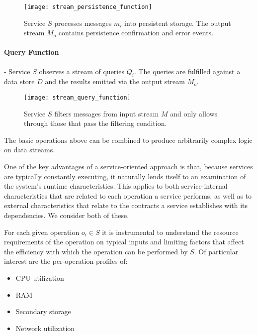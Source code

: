 \begin{figure}[H]
\texttt{[image: stream\_persistence\_function]}
\centering
\caption {Service $S$ processes messages $m_i$ into persistent storage. The output stream $M_o$ contains persistence confirmation and error events.}
\label{fig:stream_persistence_function}
\end{figure}

\paragraph{Query Function} - Service $S$ observes a stream of queries $Q_i$. The queries are fulfilled against a data store $D$ and the results emitted via the output stream $M_o$.

\begin{figure}[H]
\texttt{[image: stream\_query\_function]}
\centering
\caption {Service $S$ filters messages from input stream $M$ and only allows through those that pass the filtering condition.}
\label{fig:stream_query_function}
\end{figure}

The basic operations above can be combined to produce arbitrarily complex logic on data streams.

One of the key advantages of a service-oriented approach is that, because services are typically constantly executing, it naturally lends itself to an examination of the system's runtime characteristics. This applies to both service-internal characteristics that are related to each operation a service performs, as well as to external characteristics that relate to the contracts a service establishes with its dependencies. We consider both of these.

For each given operation $o_i \in S$ it is instrumental to understand the resource requirements of the operation on typical inputs and limiting factors that affect the efficiency with which the operation can be performed by $S$. Of particular interest are the per-operation profiles of:

\begin{itemize}
    \item CPU utilization
    \item RAM
    \item Secondary storage
    \item Network utilization
\end{itemize}

